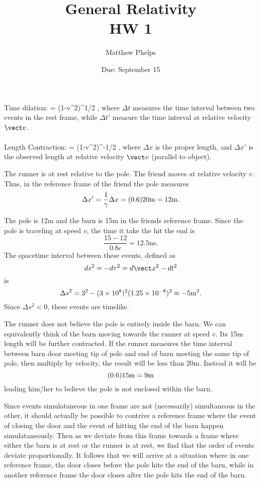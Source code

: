 \documentclass[10pt,letterpaper]{article}
\title{General Relativity\\HW 1}
\author{Matthew Phelps}
\date{Due: September 15}
\begin{document}
\maketitle

\benum

\item
Time dilation:
\be
	 = (1-\vect v^2)^{1/2} \equiv {}\gamma,
\ee
where $\Delta t$ measures the time interval between two events in the rest frame, while $\Delta t'$ measure the time interval at relative velocity $\vect v$. \\ \\
Length Contraction:
\be
	 = (1-\vect v^2)^{-1/2} \equiv \gamma,
\ee
where $\Delta x$ is the proper length, and $\Delta x'$ is the observed length at relative velocity $\vect v$ (parallel to object). \\ 
\benum
\item
The runner is at rest relative to the pole. The friend moves at relative velocity $v$. Thus, in the reference frame of the friend the pole measures
\[
	\Delta x' = \frac1\gamma \Delta x = (0.6)20\text m = 12\text m.
\]
\item
	The pole is 12m and the barn is 15m in the friends reference frame. Since the pole is traveling at speed $v$, the time
	it take the hit the end is
\[
	\frac{15-12}{0.8c} = 12.5\text{ns}.
\]
The spacetime interval between these events, defined as
\[
	ds^2 = -d\tau^2 = d\vect x^2 - dt^2
\] 
is
\[
	\Delta s^2 = 3^2 - (3\times 10^8)^2(1.25\times 10^{-8})^2 \approx -5\text m^2.
\]
Since $\Delta s^2 < 0$, these events are timelike. \\
\item
The runner does not believe the pole is entirely inside the barn. We can equivalently think of the barn moving towards the runner at speed $v$. Its 15m length will be further contracted. If the runner measures the time interval between barn door meeting tip of pole and end of barn meeting the same tip of pole, then multiply by velocity, the result will be less than 20m. Instead it will be
\[
	(0.6)15\text m = 9\text m
\]
leading him/her to believe the pole is not enclosed within the barn.
\item
Since events simulataneous in one frame are not (necessarily) simultaneous in the other, it should actually be possible to contrive a reference frame where the event of closing the door and the event of hitting the end of the barn happen simulataneously. Then as we deviate from this frame towards a frame where either the barn is at rest or the runner is at rest, we find that the order of events deviate proportionally. It follows that we will arrive at a situation where in one reference frame, the door closes before the pole hits the end of the barn, while in another reference frame the door closes after the pole hits the end of the barn. 
\end{document}
